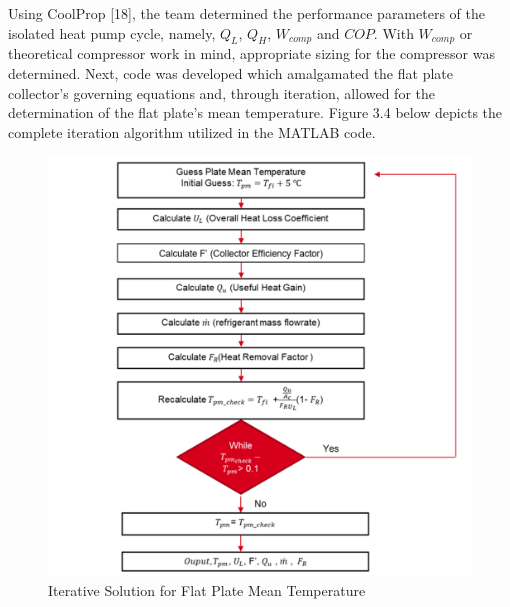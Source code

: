 \medskip
Using CoolProp [18], the team determined the performance parameters of the isolated heat pump cycle, namely, $Q_L$, $Q_H$, $W_{comp}$ and $COP$. With $W_{comp}$  or theoretical compressor work in mind, appropriate sizing for the compressor was determined. Next, code was developed which amalgamated the flat plate collector’s governing equations and, through iteration, allowed for the determination of the flat plate’s mean temperature. Figure 3.4 below depicts the complete iteration algorithm utilized in the MATLAB code.

\medskip
\begin{figure}[H]
    \centering
    \includegraphics[width=12cm]{images/iterative_solution.png}
    \caption{Iterative Solution for Flat Plate Mean Temperature}
\end{figure}

